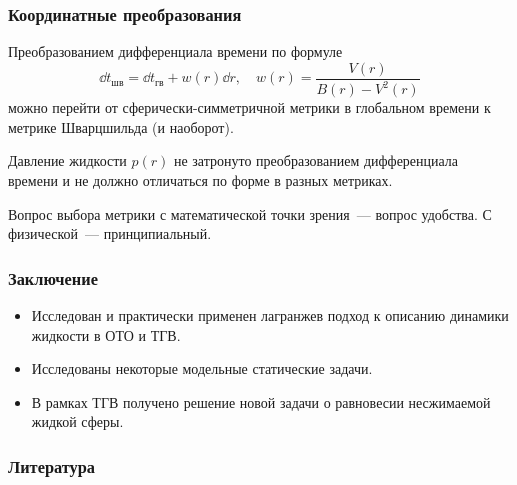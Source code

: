 \documentclass[compress]{beamer}
\providecommand{\docroot}{../..}
\begin{document}

    \begin{frame}\frametitle{Координатные преобразования}

        Преобразованием дифференциала времени по формуле
        \begin{equation*}
            \dd{t}_\text{шв} = \dd{t}_\text{гв} + w(r) \dd{r}, \quad
            w(r) = \frac{V(r)}{B(r) - V^2(r)}
        \end{equation*}
        можно перейти от сферически-симметричной метрики в глобальном времени к метрике Шварцшильда (и наоборот).

        Давление жидкости $p(r)$ не затронуто преобразованием дифференциала времени и не должно отличаться по форме в разных метриках.

        Вопрос выбора метрики с математической точки зрения~--- вопрос удобства. С физической~--- принципиальный.

    \end{frame}


    \begin{frame}\frametitle{Заключение}

        \begin{itemize}
            \item Исследован и практически применен лагранжев подход к описанию динамики жидкости в ОТО и ТГВ.
            \item Исследованы некоторые модельные статические задачи.
            \item В рамках ТГВ получено решение новой задачи о равновесии несжимаемой жидкой сферы.
        \end{itemize}

    \end{frame}


    \begin{frame}\frametitle{Литература}

        {\tiny{
        
        
        }}

    \end{frame}
\end{document}
